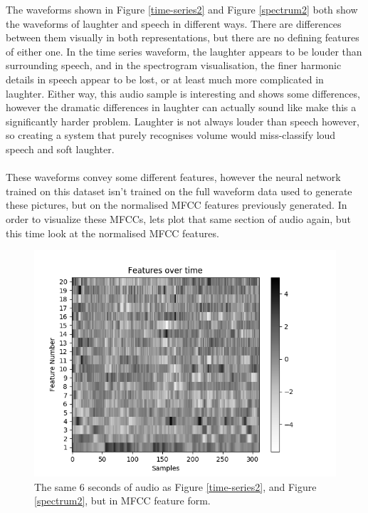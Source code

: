 \documentclass[a4paper,11pt,notitlepage]{article}
\begin{document}
The waveforms shown in Figure \ref{time-series2} and Figure \ref{spectrum2} both show the waveforms of laughter and speech in different ways. There are differences between them visually in both representations, but there are no defining features of either one. In the time series waveform, the laughter appears to be louder than surrounding speech, and in the spectrogram visualisation, the finer harmonic details in speech appear to be lost, or at least much more complicated in laughter. Either way, this audio sample is interesting and shows some differences, however the dramatic differences in laughter can actually sound like make this a significantly harder problem. Laughter is not always louder than speech however, so creating a system that purely recognises volume would miss-classify loud speech and soft laughter.\\
\\
These waveforms convey some different features, however the neural network trained on this dataset isn't trained on the full waveform data used to generate these pictures, but on the normalised MFCC features previously generated. In order to visualize these MFCCs, lets plot that same section of audio again, but this time look at the normalised MFCC features.

\begin{figure}[H]
	\centering
	\vspace{0.5cm}
	\includegraphics[scale = 0.8]{figs/features_visualisation_grey.png}
	\caption{The same 6 seconds of audio as Figure \ref{time-series2}, and Figure \ref{spectrum2}, but in MFCC feature form.}
	\label{mfcc-visualisation}
\end{figure}
\end{document}
